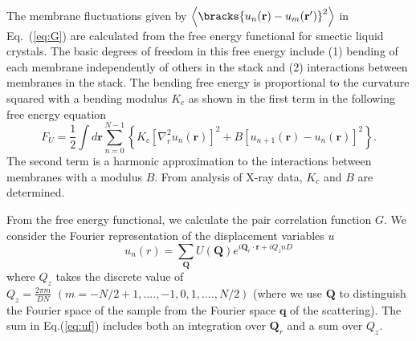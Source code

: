 The membrane fluctuations given by $\left\langle\bracks{u_n(\mathbf{r})-u_m(\mathbf{r'})}^2\right\rangle$ 
in Eq.~(\ref{eq:G}) are calculated from the free energy functional 
for smectic liquid crystals. The basic degrees of freedom in this free energy
include (1) bending of each membrane independently of others in the
stack and (2) interactions between membranes in the stack. The bending
free energy is proportional to the curvature squared with a bending
modulus $K_{c}$ as shown in the first term in the following free energy equation
\begin{equation}
  F_{U}=\frac{1}{2}\int d\mathbf{r}\sum _{n=0}^{N-1}\left\{ 
  K_{c} \left[\nabla _{r}^{2}u_{n}\left(\mathbf{r}\right)\right]^{2}
  +B\left[u_{n+1}\left(\mathbf{r}\right)-u_{n}\left(\mathbf{r}\right)\right]^{2}
  \right\}.
  \label{eq:free_energy}
\end{equation}
The second term is a harmonic approximation to the interactions between
membranes with a modulus $B$. From analysis of X-ray data, $K_c$ and $B$ are
determined.

From the free energy functional, we calculate the pair correlation function
$G$. We consider the Fourier representation of the displacement variables $u$
\begin{equation}
  u_{n}\left(r\right)=\sum _{\mathbf{Q}}U(\mathbf{Q})e^{i\mathbf{Q}_{r}\cdot \mathbf{r}+iQ_{z}nD}
  \label{eq:uf}
\end{equation}
where $Q_{z}$ takes the discrete value of 
$Q_{z}=\frac{2\pi m}{DN}\, \, (m=-N/2+1,....,-1,0,1,....,N/2)$
(where we use $\mathbf{Q}$ to distinguish the Fourier space of the
sample from the Fourier space $\mathbf{q}$ of the scattering). 
The sum in Eq.(\ref{eq:uf}) includes both an integration over $\mathbf{Q}_{r}$
and a sum over $Q_{z}$. 

